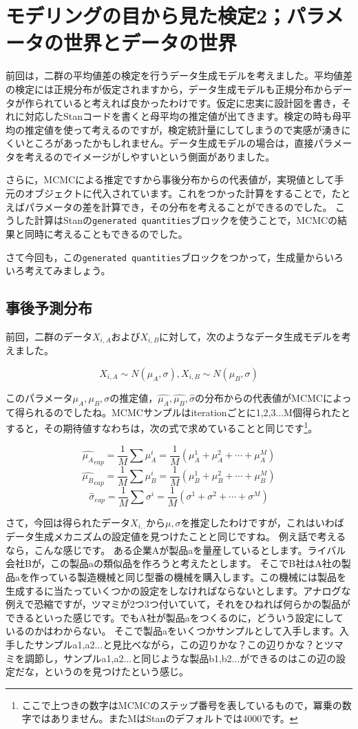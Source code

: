 \documentclass{ltjsbook}
\begin{document}
\chapter{モデリングの目から見た検定2；パラメータの世界とデータの世界}
\label{x20_modeling2}
前回は，二群の平均値差の検定を行うデータ生成モデルを考えました。平均値差の検定には正規分布が仮定されますから，データ生成モデルも正規分布からデータが作られていると考えれば良かったわけです。仮定に忠実に設計図を書き，それに対応したStanコードを書くと母平均の推定値が出てきます。検定の時も母平均の推定値を使って考えるのですが，検定統計量にしてしまうので実感が湧きにくいところがあったかもしれません。データ生成モデルの場合は，直接パラメータを考えるのでイメージがしやすいという側面がありました。

さらに，MCMCによる推定ですから事後分布からの代表値が，実現値として手元のオブジェクトに代入されています。これをつかった計算をすることで，たとえばパラメータの差を計算でき，その分布を考えることができるのでした。
こうした計算はStanの\texttt{generated quantities}ブロックを使うことで，MCMCの結果と同時に考えることもできるのでした。

さて今回も，この\texttt{generated quantities}ブロックをつかって，生成量からいろいろ考えてみましょう。
\section{事後予測分布}
前回，二群のデータ$X_{i,A}$および$X_{i,B}$に対して，次のようなデータ生成モデルを考えました。

$$ X_{i,A} \sim N(\mu_A,\sigma), X_{i,B} \sim N(\mu_B,\sigma) $$

このパラメータ$\mu_A,\mu_B,\sigma$の推定値，$\hat{\mu_A},\hat{\mu_B},\hat{\sigma}$の分布からの代表値がMCMCによって得られるのでしたね。MCMCサンプルはiterationごとに1,2,3...M個得られたとすると，その期待値すなわちは，次の式で求めていることと同じです\footnote{ここで上つきの数字はMCMCのステップ番号を表しているもので，冪乗の数字ではありません。またMはStanのデフォルトでは4000です。}。

$$ \hat{\mu_A}_{eap} = \frac{1}{M}\sum \mu_A^i = \frac{1}{M}(\mu_A^1+\mu_A^2+\cdots+\mu_A^M) $$
$$ \hat{\mu_B}_{eap} = \frac{1}{M}\sum \mu_B^i = \frac{1}{M}(\mu_B^1+\mu_B^2+\cdots+\mu_B^M) $$
$$ \hat{\sigma}_{eap} = \frac{1}{M}\sum \sigma^i = \frac{1}{M}(\sigma^1+\sigma^2+\cdots+\sigma^M) $$

さて，今回は得られたデータ$X_{i,.}$から$\mu,\sigma$を推定したわけですが，これはいわばデータ生成メカニズムの設定値を見つけたことと同じですね。
例え話で考えるなら，こんな感じです。
ある企業Aが製品aを量産しているとします。ライバル会社Bが，この製品aの類似品を作ろうと考えたとします。
そこでB社はA社の製品aを作っている製造機械と同じ型番の機械を購入します。この機械には製品を生成するに当たっていくつかの設定をしなければならないとします。アナログな例えで恐縮ですが，ツマミが2つ3つ付いていて，それをひねれば何らかの製品ができるといった感じです。でもA社が製品aをつくるのに，どういう設定にしているのかはわからない。
そこで製品aをいくつかサンプルとして入手します。入手したサンプルa1,a2...と見比べながら，この辺りかな？この辺りかな？とツマミを調節し，サンプルa1,a2...と同じような製品b1,b2...ができるのはこの辺の設定だな，というのを見つけたという感じ。
\end{document}

